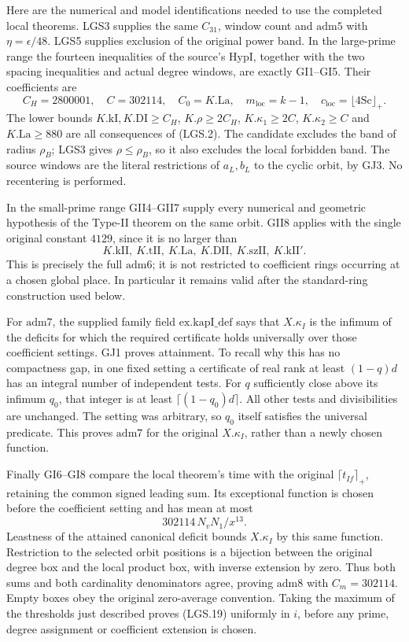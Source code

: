 Here are the numerical and model identifications needed to use
the completed local theorems.  LGS3 supplies the same
\(C_{31}\), window count and \(\mathrm{adm5}\) with
\(\eta=\epsilon/48\).  LGS5 supplies exclusion of the original
power band.  In the large-prime range the fourteen inequalities
of the source's \(\mathrm{HypI}\), together with the two
spacing inequalities and actual degree windows, are exactly
GI1--GI5.  Their coefficients are
\[
 C_H=2800001,\quad C=302114,\quad C_0=K.\mathrm{La},\quad
 m_{\mathrm{loc}}=k-1,\quad c_{\mathrm{loc}}=\lfloor4\mathrm{Sc}\rfloor_+.
                                                               \tag{LGS.20}
\]
The lower bounds \(K.\mathrm{kI},K.\mathrm{DI}\ge C_H\),
\(K.\rho\ge2C_H\), \(K.\kappa_1\ge2C\),
\(K.\kappa_2\ge C\) and \(K.\mathrm{La}\ge880\)
are all consequences of (LGS.2).  The candidate excludes the
band of radius \(\rho_B\); LGS3 gives \(\rho\le\rho_B\),
so it also excludes the local forbidden band.  The source
windows are the literal restrictions of \(a_L,b_L\) to
the cyclic orbit, by GJ3.  No recentering is performed.

In the small-prime range GII4--GII7 supply every numerical
and geometric hypothesis of the Type-II theorem on the same
orbit.  GII8 applies with the single original constant \(4129\),
since it is no larger than
\[
 K.\mathrm{kII},\ K.\mathrm{tII},\ K.\mathrm{La},\
 K.\mathrm{DII},\ K.\mathrm{szII},\ K.\mathrm{kII}'.
\]
This is precisely the full \(\mathrm{adm6}\); it is not
restricted to coefficient rings occurring at a chosen
global place.  In particular it remains valid after the
standard-ring construction used below.

For \(\mathrm{adm7}\), the supplied family field
\(\mathrm{ex.kapI\_def}\) says that \(X.\kappa_I\) is the
infimum of the deficits for which the required certificate
holds universally over those coefficient settings.
GJ1 proves attainment.  To recall why this has no compactness
gap, in one fixed setting a certificate of real rank at least
\((1-q)d\) has an integral number of independent tests.
For \(q\) sufficiently close above its infimum \(q_0\),
that integer is at least \(\lceil(1-q_0)d\rceil\).
All other tests and divisibilities are unchanged.  The
setting was arbitrary, so \(q_0\) itself satisfies the
universal predicate.  This proves \(\mathrm{adm7}\) for the
original \(X.\kappa_I\), rather than a newly chosen function.

Finally GI6--GI8 compare the local theorem's time with the
original \(\lceil t_{If}\rceil_+\), retaining the common
signed leading sum.  Its exceptional function is chosen
before the coefficient setting and has mean at most
\[
                   302114\,N_vN_1/x^{13}.             \tag{LGS.21}
\]
Leastness of the attained canonical deficit bounds
\(X.\kappa_I\) by this same function.  Restriction to the
selected orbit positions is a bijection between the
original degree box and the local product box, with inverse
extension by zero.  Thus both sums and both cardinality
denominators agree, proving \(\mathrm{adm8}\) with
\(C_m=302114\).  Empty boxes obey the original zero-average
convention.  Taking the maximum of the thresholds just
described proves (LGS.19) uniformly in \(i\), before any
prime, degree assignment or coefficient extension is chosen.

